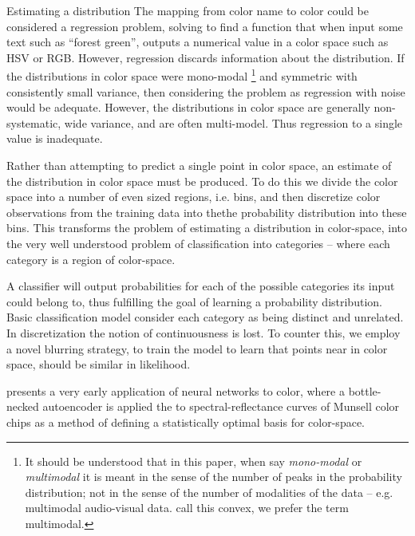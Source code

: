 

Estimating a distribution 
The mapping from color name to color could be considered a regression problem, solving to find a function that when input some text such as ``forest green'', outputs a numerical value in a color space such as HSV or RGB.
However, regression discards information about the distribution.
If the distributions in color space were mono-modal
\footnote{It should be understood that in this paper, when say \emph{mono-modal} or \emph{multimodal} it is meant in the sense of the number of peaks in the probability distribution; not in the sense of the number of modalities of the data -- e.g. multimodal audio-visual data. 
	\textcite{mcmahan2015bayesian} call this convex, we prefer the term multimodal.}
and symmetric with consistently small variance, then considering the problem as regression with noise would be adequate.
However, the distributions in color space are generally non-systematic, wide variance, and are often multi-model.
Thus regression to a single value is inadequate.

Rather than attempting to predict a single point in color space, an estimate of the distribution in color space must be produced.
To do this we divide the color space into a number of even sized regions, i.e.  bins, and then discretize color observations from the training data into thethe probability distribution into these bins.
This transforms the problem of estimating a distribution in color-space,
into the very well understood problem of classification into categories -- where each category is a region of color-space.

A classifier will output probabilities for each of the possible categories its input could belong to, thus fulfilling the goal of learning a probability distribution.
Basic classification model consider each category as being distinct and unrelated.
In discretization the notion of continuousness is lost.
To counter this, we employ a novel blurring strategy, to train the model to learn that points near in color space, should be similar in likelihood.


\textcite{Usui:92} presents a very early application of neural networks to color, where a bottle-necked autoencoder is applied the to spectral-reflectance curves of Munsell color chips as a method of defining a statistically optimal basis for color-space.

